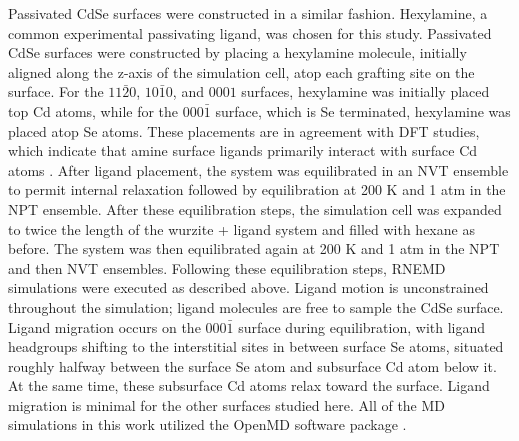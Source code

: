 Passivated CdSe surfaces were constructed in a similar fashion. Hexylamine, a common experimental passivating ligand, was chosen for this study. Passivated CdSe surfaces were constructed by placing a hexylamine molecule, initially aligned along the z-axis of the simulation cell, atop each grafting site on the surface.  For the $11\bar{2}0$, $10\bar{1}0$, and $0001$ surfaces, hexylamine was initially placed top Cd atoms, while for the $000\bar{1}$ surface, which is Se terminated, hexylamine was placed atop Se atoms.  These placements are in agreement with DFT studies, which indicate that amine surface ligands primarily interact with surface Cd atoms \cite{doi:10.1021/jp064051f, doi:10.1021/jp903291d}.  After ligand placement, the system was equilibrated in an NVT ensemble to permit internal relaxation followed by equilibration at 200 K and 1 atm in the NPT ensemble. After these equilibration steps, the simulation cell was expanded to twice the length of the wurzite + ligand system and filled with hexane as before. The system was then equilibrated again at 200 K and 1 atm in the NPT and then NVT ensembles. Following these equilibration steps, RNEMD simulations were executed as described above. Ligand motion is unconstrained throughout the simulation; ligand molecules are free to sample the CdSe surface. Ligand migration occurs on the $000\bar{1}$ surface during equilibration, with ligand headgroups shifting to the interstitial sites in between surface Se atoms, situated roughly halfway between the surface Se atom and subsurface Cd atom below it. At the same time, these subsurface Cd atoms relax toward the surface. Ligand migration is minimal for the other surfaces studied here. All of the MD simulations in this work utilized the OpenMD software package \cite{gezelter2010openmd}.

